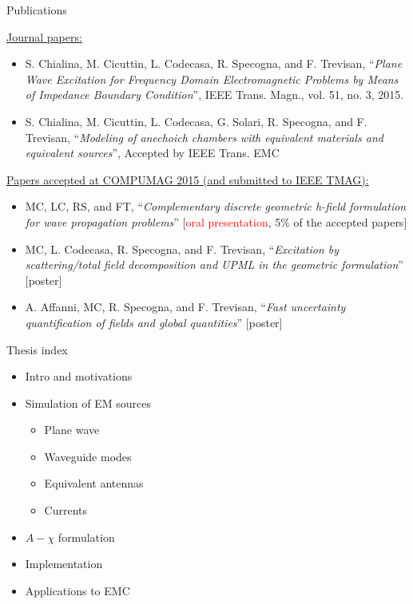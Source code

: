 \documentclass{beamer}
\begin{document}
\begin{frame}{Publications}

    {\footnotesize \underline{Journal papers:}}

    \begin{itemize}
        \item {\scriptsize S. Chialina, M. Cicuttin, L. Codecasa, R. Specogna, and F. Trevisan, ``\emph{Plane Wave Excitation for Frequency Domain Electromagnetic Problems by Means of Impedance Boundary Condition}'', IEEE Trans. Magn., vol. 51, no. 3, 2015.}
        \item {\scriptsize S. Chialina, M. Cicuttin, L. Codecasa, G. Solari, R. Specogna, and F. Trevisan, ``\emph{Modeling of anechoich chambers with equivalent materials and equivalent sources}'', Accepted by IEEE Trans. EMC}
    \end{itemize}

    {\footnotesize \underline{Papers accepted at COMPUMAG 2015 (and submitted to IEEE TMAG):}}
    \begin{itemize}
        \item {\scriptsize MC, LC, RS, and FT, ``\emph{Complementary discrete geometric h-field formulation for wave propagation problems}'' [\textcolor{red}{oral presentation}, 5\% of the accepted papers]}

        \item {\scriptsize MC, L. Codecasa, R. Specogna, and F. Trevisan, ``\emph{Excitation by scattering/total field decomposition and UPML in the geometric formulation}'' [poster]}

        \item {\scriptsize A. Affanni, MC, R. Specogna, and F. Trevisan, ``\emph{Fast uncertainty quantification of fields and global quantities}'' [poster]}

    \end{itemize}

\end{frame}


\begin{frame}{Thesis index}
    \begin{itemize}
        \item Intro and motivations
        \item Simulation of EM sources
        \begin{itemize}
            \item Plane wave
            \item Waveguide modes
            \item Equivalent antennas
            \item Currents
        \end{itemize}
    \item $A-\chi$ formulation
    \item Implementation
    \item Applications to EMC
    \end{itemize}
\end{frame}
\end{document}
